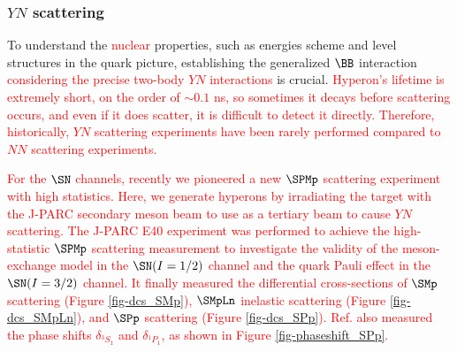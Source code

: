 \subsubsection{$YN$ scattering}
To understand the \textcolor{red}{nuclear} properties, such as energies scheme and level structures in the quark picture, establishing the generalized $\BB$ interaction \textcolor{red}{considering the precise two-body $YN$ interactions} is crucial. \textcolor{red}{ Hyperon's lifetime is extremely short, on the order of $\sim0.1$ ns, so sometimes it decays before scattering occurs, and even if it does scatter, it is difficult to detect it directly. Therefore, historically, $YN$ scattering experiments have been rarely performed compared to $NN$ scattering experiments. }

\textcolor{red}{ For the $\SN$ channels, recently we pioneered a new $\SPMp$ scattering experiment with high statistics. Here, we generate hyperons by irradiating the target with the J-PARC secondary meson beam to use as a tertiary beam to cause $YN$ scattering. %
The J-PARC E40 experiment was performed to achieve the high-statistic $\SPMp$ scattering measurement to investigate the validity of the meson-exchange model in the $\SN(I=1/2)$ channel and the quark Pauli effect in the $\SN(I=3/2)$ channel. It finally measured the differential cross-sections of $\SMp$ scattering \cite{Miwa-SMp} (Figure \ref{fig-dcs_SMp}), $\SMpLn$ inelastic scattering \cite{Miwa-SMLn} (Figure \ref{fig-dcs_SMpLn}), and $\SPp$ scattering \cite{Nana-SPp} (Figure \ref{fig-dcs_SPp}). Ref. \cite{Nana-SPp} also measured the phase shifts $\delta_{^3S_1}$ and $\delta_{^1P_1}$, as shown in Figure \ref{fig-phaseshift_SPp}. }

